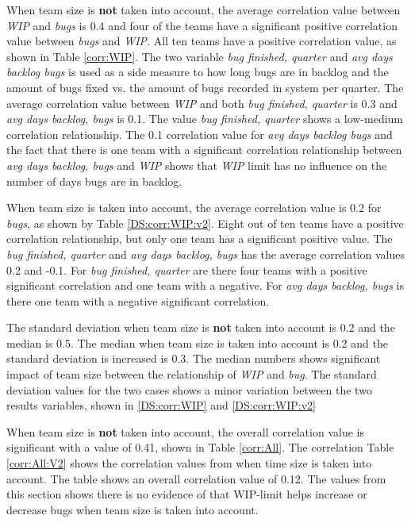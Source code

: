 \documentclass[UKenglish]{ifimaster}  %
\begin{document}
When team size is \textbf{not} taken into account, the average correlation value between \textit{WIP} and \textit{bugs} is 0.4 and four of the teams have a significant positive correlation value between \textit{bugs} and \textit{WIP}. All ten teams have a positive correlation value, as shown in Table \ref{corr:WIP}. The two variable \textit{bug finished, quarter} and \textit{avg days backlog bugs} is used as a side measure to how long bugs are in backlog and the amount of bugs fixed vs. the amount of bugs recorded in system per quarter. The average correlation value between \textit{WIP} and both \textit{bug finished, quarter} is 0.3 and \textit{avg days backlog, bugs} is 0.1. The value \textit{bug finished, quarter} shows a low-medium correlation relationship. The 0.1 correlation value for  \textit{avg days backlog bugs} and the fact that there is one team with a significant correlation relationship between \textit{avg days backlog, bugs} and \textit{WIP} shows that  \textit{WIP} limit has no influence on the number of days bugs are in backlog. 

When team size is taken into account, the average correlation value is 0.2 for \textit{bugs}, as shown by Table \ref{DS:corr:WIP:v2}.  Eight out of ten teams have a positive correlation relationship, but only one team has a significant positive value. The  \textit{bug finished, quarter} and \textit{avg days backlog, bugs}  has the average correlation values 0.2 and -0.1. For \textit{bug finished, quarter} are there four teams with a positive significant correlation and one team with a negative. For \textit{avg days backlog, bugs} is there one team with a negative significant correlation. %

The standard deviation when team size is \textbf{not} taken into account is 0.2 and the median is 0.5. The median when team size is taken into account is 0.2 and the standard deviation is increased is 0.3. The median numbers shows significant impact of team size between the relationship of \textit{WIP} and \textit{bug}. The standard deviation values for the two cases shows a minor variation between the two results variables, shown in \ref{DS:corr:WIP} and \ref{DS:corr:WIP:v2}    

When team size is \textbf{not} taken into account, the overall correlation value is significant with a value of  0.41, shown in Table \ref{corr:All}.  The correlation Table \ref{corr:All:V2} shows the correlation values from when time size is taken into account. The table shows an overall correlation value of 0.12. The values from this section shows there is no evidence of that WIP-limit helps increase or decrease bugs when team size is taken into account.  
\end{document}
